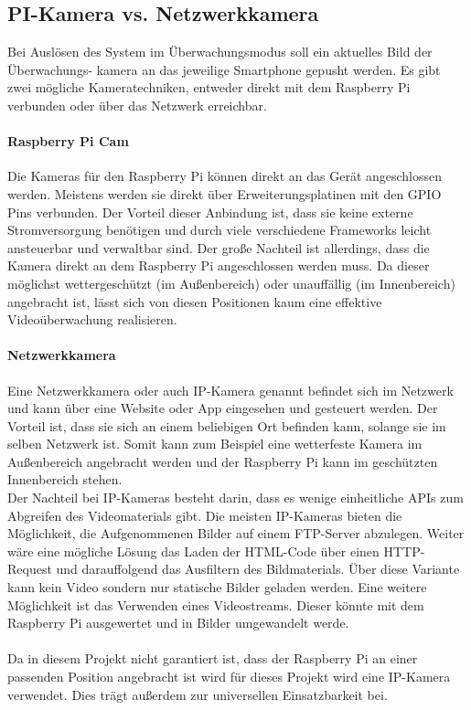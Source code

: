 \subsection{PI-Kamera vs. Netzwerkkamera}
Bei Auslösen des System im Überwachungsmodus soll ein aktuelles Bild der  Überwachungs- kamera an das jeweilige Smartphone gepusht werden. Es gibt zwei mögliche Kameratechniken, entweder direkt mit dem Raspberry Pi verbunden oder über das Netzwerk erreichbar.
\paragraph{Raspberry Pi Cam} 
Die Kameras für den Raspberry Pi können direkt an das Gerät angeschlossen werden. Meistens werden sie direkt über Erweiterungsplatinen mit den GPIO Pins verbunden. Der Vorteil dieser Anbindung ist, dass sie keine externe Stromversorgung benötigen und durch viele verschiedene Frameworks leicht ansteuerbar und verwaltbar sind. Der große Nachteil ist allerdings, dass die Kamera direkt an dem Raspberry Pi angeschlossen werden muss. Da dieser möglichst wettergeschützt (im Außenbereich) oder unauffällig (im Innenbereich) angebracht ist, lässt sich von diesen Positionen kaum eine effektive Videoüberwachung realisieren. \\

\paragraph{Netzwerkkamera} 
Eine Netzwerkkamera oder auch IP-Kamera genannt befindet sich im Netzwerk und kann über eine Website oder App eingesehen und gesteuert werden. Der Vorteil ist, dass sie sich an einem beliebigen Ort befinden kann, solange sie im selben Netzwerk ist. Somit kann zum Beispiel eine wetterfeste Kamera im Außenbereich angebracht werden und der Raspberry Pi kann im geschützten Innenbereich stehen. \\
Der Nachteil bei IP-Kameras besteht darin, dass es wenige einheitliche APIs zum Abgreifen des Videomaterials gibt. Die meisten IP-Kameras bieten die Möglichkeit, die Aufgenommenen Bilder auf einem FTP-Server abzulegen. Weiter wäre eine mögliche Lösung das Laden der HTML-Code über einen HTTP-Request und darauffolgend das Ausfiltern des Bildmaterials. Über diese Variante kann kein Video sondern nur statische Bilder geladen werden. Eine weitere Möglichkeit ist das Verwenden eines Videostreams. Dieser könnte mit dem Raspberry Pi ausgewertet und in Bilder umgewandelt werde.
 \\\\
Da in diesem Projekt nicht garantiert ist, dass der Raspberry Pi an einer passenden Position angebracht ist wird für dieses Projekt wird eine IP-Kamera verwendet. Dies trägt außerdem zur universellen Einsatzbarkeit bei.

